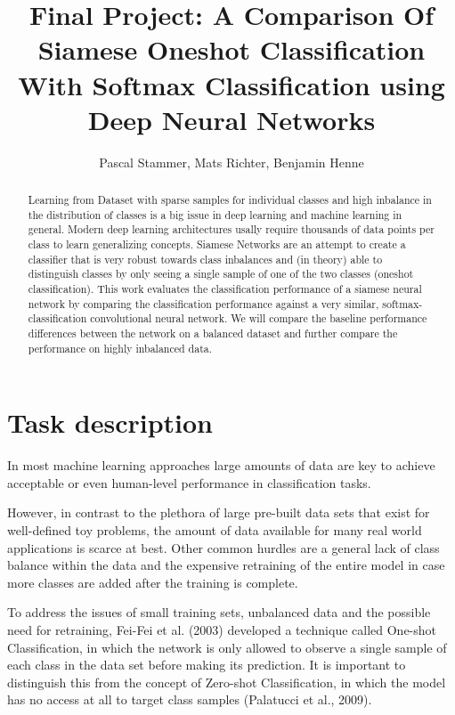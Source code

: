 \documentclass[a4paper,pt12]{article}
\begin{document}
\author{Pascal Stammer, Mats Richter, Benjamin Henne}
\title{Final Project: A Comparison Of Siamese Oneshot Classification With Softmax Classification using Deep Neural Networks}

\maketitle

\begin{abstract}
Learning from Dataset with sparse samples for individual classes and high inbalance in the distribution of classes is a big issue in deep learning and machine learning in general. Modern deep learning architectures usally require thousands of data points per class to learn generalizing concepts. Siamese Networks are an attempt to create a classifier that is very robust towards class inbalances and (in theory) able to distinguish classes by only seeing a single sample of one of the two classes (oneshot classification). This work evaluates the classification performance of a siamese neural network by comparing the classification performance against a very similar, softmax-classification convolutional neural network. We will compare the baseline performance differences between the network on a balanced dataset and further compare the performance on highly inbalanced data. 

\end{abstract}

\section{Task description}
In most machine learning approaches large amounts of data are key to achieve acceptable or even human-level performance in classification tasks.

However, in contrast to the plethora of large pre-built data sets that exist for well-defined toy problems, the amount of data available for many real world applications is scarce at best. Other common hurdles are a general lack of class balance within the data and the expensive retraining of the entire model in case more classes are added after the training is complete.

To address the issues of small training sets, unbalanced data and the possible need for retraining, Fei-Fei et al. (2003) developed a technique called One-shot Classification, in which the network is only allowed to observe a single sample of each class in the data set before making its prediction. It is important to distinguish this from the concept of Zero-shot Classification, in which the model has no access at all to target class samples (Palatucci et al., 2009).
\end{document}
